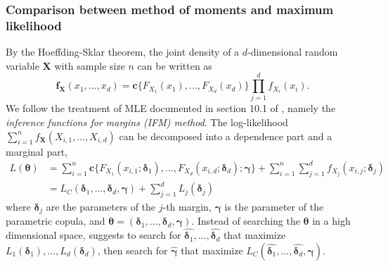 \subsubsection{Comparison between method of moments and maximum likelihood}
\label{subsec:maximum-likelihood-estimation}
By the Hoeffding-Sklar theorem, the joint density of a $d$-dimensional random variable $\bm{X}$ with sample size $n$ can be written as
\begin{equation*}
    \bm{f}_{\bm{X}}(x_1, ..., x_d) = \bm{c}\{F_{X_1}(x_1), ..., F_{X_d}(x_d)\} \prod_{j=1}^d f_{X_i}(x_i).
    \end{equation*}
We follow the treatment of MLE documented in section 10.1 of
\citet{joe1997multivariate}, namely the {\em inference functions for
margins (IFM) method}.
The log-likelihood $\sum^n_{i=1}f_{\bm{X}}(X_{i,1}, ..., X_{i,d})$ can be decomposed into a dependence part and a marginal part,
\begin{align*}
    L(\bm{\theta}) &= \sum_{i=1}^n \bm{c}\{F_{X_1}(x_{i,1};\bm{\delta}_1), ..., F_{X_d}(x_{i,d}; \bm{\delta}_d);\bm{\gamma}\}
    + \sum_{i=1}^n \sum_{j=1}^d f_{X_j}(x_{i,j};\bm{\delta}_j)\\
    &= L_C(\bm{\delta}_1, ..., \bm{\delta}_d, \bm{\gamma}) + \sum_{j=1}^d L_j(\bm{\delta}_j)
    \end{align*}
where $\bm{\delta}_j$ are the parameters of the $j$-th margin, $\bm{\gamma}$ is the parameter of the parametric copula, and
$\bm{\theta} = (\bm{\delta}_1,..., \bm{\delta}_d, \bm{\gamma})$.
Instead of searching the $\bm{\theta}$ in a high dimensional space, \citet{joe1997multivariate} suggests to
search for $\hat{\bm{\delta}_1},..., \hat{\bm{\delta}_d}$ that maximize $L_1(\bm{\delta}_1), ..., L_d(\bm{\delta}_d)$,
then search for $\hat{\bm{\gamma}}$ that maximize $L_C(\hat{\bm{\delta}_1},..., \hat{\bm{\delta}_d}, \bm{\gamma})$.



